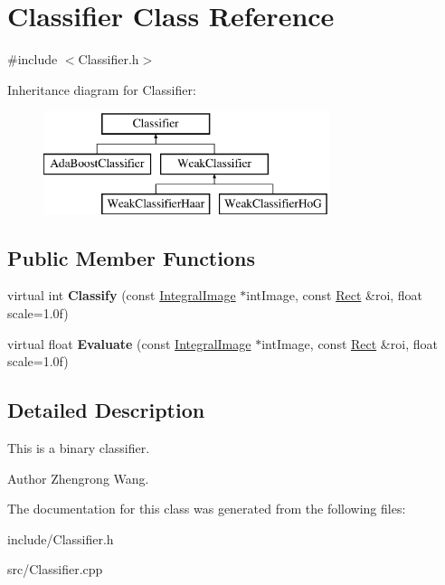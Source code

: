 \hypertarget{classClassifier}{}\section{Classifier Class Reference}
\label{classClassifier}


{\ttfamily \#include $<$Classifier.\+h$>$}

Inheritance diagram for Classifier\+:\begin{figure}[H]
\begin{center}
\leavevmode
\includegraphics[height=3.000000cm]{classClassifier}
\end{center}
\end{figure}
\subsection*{Public Member Functions}
\begin{DoxyCompactItemize}
\item 
\hypertarget{classClassifier_a126cdbb3bc72d17a6d1184126a7545a0}{}virtual int {\bfseries Classify} (const \hyperlink{classIntegralImage}{Integral\+Image} $\ast$int\+Image, const \hyperlink{classRect}{Rect} \&roi, float scale=1.\+0f)\label{classClassifier_a126cdbb3bc72d17a6d1184126a7545a0}

\item 
\hypertarget{classClassifier_a4e0671ac06531f98373feb917a076c46}{}virtual float {\bfseries Evaluate} (const \hyperlink{classIntegralImage}{Integral\+Image} $\ast$int\+Image, const \hyperlink{classRect}{Rect} \&roi, float scale=1.\+0f)\label{classClassifier_a4e0671ac06531f98373feb917a076c46}

\end{DoxyCompactItemize}


\subsection{Detailed Description}
This is a binary classifier. \begin{DoxyAuthor}{Author}
Zhengrong Wang. 
\end{DoxyAuthor}


The documentation for this class was generated from the following files\+:\begin{DoxyCompactItemize}
\item 
include/Classifier.\+h\item 
src/Classifier.\+cpp\end{DoxyCompactItemize}
